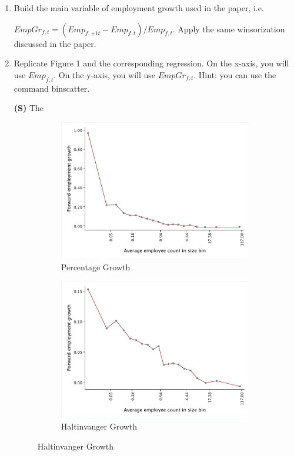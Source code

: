 \documentclass[12pt]{article}
\begin{document}
\begin{enumerate}[leftmargin=0pt, label=\textbf{(\alph*)}]

\item Build the main variable of employment growth used in the paper, i.e.

$E m p G r_{f, t}=\left(E m p_{f,+1 t}-E m p_{f, t}\right) / E m p_{f, t}$. Apply the same winsorization discussed in the paper.

\item Replicate Figure 1 and the corresponding regression. On the x-axis, you will use $E m p_{f, t}$. On the y-axis, you will use $E m p G r_{f, t}$. Hint: you can use the command binscatter.
\item[\textbf{(S)}] The 
\begin{figure}[htb]
\caption{Employment Growth by Firm Size}
\label{fig:growth_firm_size}
\centering
     \begin{subfigure}[b]{0.48\textwidth}
         \centering
         \includegraphics[width=\textwidth]{Figures/Figure1b.pdf}
         \caption{Percentage Growth}
     \end{subfigure}
     \hfill
     \begin{subfigure}[b]{0.48\textwidth}
         \centering
         \includegraphics[width=\textwidth]{Figures/Figure1c.pdf}
         \caption{Haltinvanger Growth}
     \end{subfigure}
\end{figure}


\end{enumerate}
\end{document}
